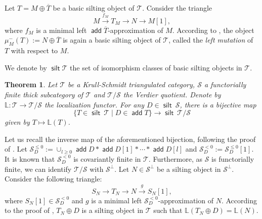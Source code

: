 \documentclass[12pt,a4paper,reqno]{amsart}
\newtheorem{theorem}{Theorem}[section]
\theoremstyle{definition}
\newcommand{\opname}[1]{\operatorname{\mathsf{#1}}}
\newcommand{\add}{\opname{add}\nolimits}
\begin{document}
Let $T=M\oplus \overline{T}$ be a basic silting object of $\mathcal{T}$. Consider the triangle
\[M\xrightarrow{f_M} T_M\to N\to M[1],
\]
where $f_M$ is a minimal left $\add \overline{T}$-approximation of $M$. According to \cite[Theorem 2.31]{AiharaIyama},  the object $\mu_M^{-}(T) := N \oplus \overline{T}$ is again a basic silting object of $\mathcal{T}$, called the {\em left mutation} of $T$ with respect to $M$. 




We denote by $\opname{silt} \mathcal{T}$ the set of isomorphism classes of basic silting objects in $\mathcal{T}$. 



\begin{theorem}\cite[Theorem 2.37]{AiharaIyama}\label{t:silting-reduction}
	Let $\mathcal{T}$ be a Krull-Schmidt triangulated category, $\mathcal{S}$ a functorially finite thick subcategory of $\mathcal{T}$ and $\mathcal{T}/\mathcal{S}$ the Verdier quotient. Denote by $\mathbb{L}:\mathcal{T}\to \mathcal{T}/\mathcal{S}$ the localization functor. For any $D\in \opname{silt}\ \mathcal{S}$,  there is a bijective map
	\[\{T\in \opname{silt}\ \mathcal{T}\mid D\in \add T\}\to \opname{silt}\ \mathcal{T}/\mathcal{S}
	\] given by $T\mapsto \mathbb{L}(T)$.
\end{theorem}
Let us recall the inverse map of the aforementioned bijection, following the proof of \cite[Theorem 2.37]{AiharaIyama}.
Let $\mathcal{S}_D^{\leq 0}:=\cup_{l\geq 0}\add D*\add D[1]*\cdots*\add D[l]$ and $\mathcal{S}_{D}^{<0}:=\mathcal{S}_D^{\leq 0}[1]$. It is known that $\mathcal{S}_{D}^{<0}$ is covariantly finite in $\mathcal{T}$.  Furthermore, as $\mathcal{S}$ is functorially finite, we can identify $\mathcal{T}/\mathcal{S}$ with $\mathcal{S}^\perp$. Let $N\in \mathcal{S}^\perp$ be a silting object in $\mathcal{S}^\perp$.
Consider the following triangle:
\[
S_N\to T_N\to N\xrightarrow{g}S_N[1],
\]
where $S_N[1]\in \mathcal{S}_{D}^{<0}$ and $g$ is a minimal left $\mathcal{S}_{D}^{<0}$-approximation of $N$. According to the proof of \cite[Theorem 2.37]{AiharaIyama},  $T_N\oplus D$ is a silting object in $\mathcal{T}$ such that $\mathbb{L}(T_N\oplus D)=\mathbb{L}(N)$.



\end{document}
